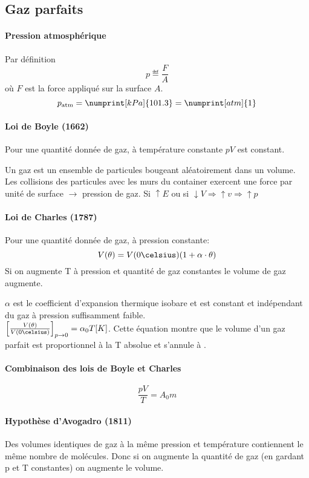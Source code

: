 \subsection{Gaz parfaits}

\paragraph{Pression atmosphérique}
Par définition
$$p \eqdef \frac{F}{A}$$
où $F$ est la force appliqué sur la surface $A$.
\[ p_\mathrm{atm}=\numprint[kPa]{101.3}=\numprint[atm]{1} \]

\paragraph{Loi de Boyle (1662)}
Pour une quantité donnée de gaz, à température constante $p V$ est constant.

Un gaz est un ensemble de particules bougeant aléatoirement dans un volume.
Les collisions des particules avec les murs du container exercent une force par unité de surface $\rightarrow$ pression de gaz.
Si $\uparrow E$ ou si $\downarrow V \Rightarrow \uparrow v \Rightarrow \uparrow p$

\paragraph{Loi de Charles (1787)}
Pour une quantité donnée de gaz, à pression constante:
\[ V(\theta)=V(0\celsius)(1+\alpha\cdot \theta) \]
Si on augmente T à pression et quantité de gaz constantes le volume de gaz augmente.

$\alpha$ est le coefficient d'expansion thermique isobare et est constant et indépendant du gaz à pression suffisamment faible.\\

$\left[\frac{V(\theta)}{V(0\celsius)}\right]_{p\rightarrow0}=\alpha_0T[K]$.
Cette équation montre que le volume d'un gaz parfait est proportionnel à la T absolue et s'annule à .

\paragraph{Combinaison des lois de Boyle et Charles}
$$\frac{pV}{T}=A_0m$$

\paragraph{Hypothèse d'Avogadro (1811)}
Des volumes identiques de gaz à la même pression et température contiennent le même nombre de molécules.
Donc si on augmente la quantité de gaz (en gardant p et T constantes) on augmente le volume.


